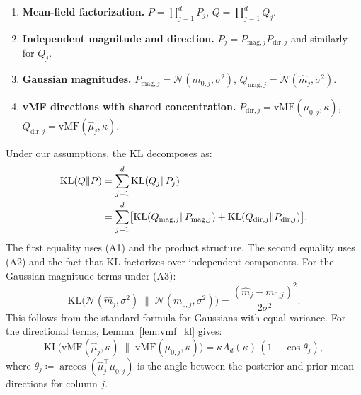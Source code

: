 \documentclass[11pt]{article}
\newcommand{\KL}{\mathrm{KL}}
\newcommand{\vMF}{\mathrm{vMF}}
\newcommand{\Ad}{A_d}
\begin{document}
\begin{enumerate}
  \item[(A1)] \textbf{Mean-field factorization.}
    $P = \prod_{j=1}^d P_j$, $Q = \prod_{j=1}^d Q_j$.
  \item[(A2)] \textbf{Independent magnitude and direction.}
    $P_j = P_{\mathrm{mag},j} P_{\mathrm{dir},j}$ and similarly for $Q_j$.
  \item[(A3)] \textbf{Gaussian magnitudes.}
    $P_{\mathrm{mag},j} = \mathcal{N}(m_{0,j}, \sigma^2)$,
    $Q_{\mathrm{mag},j} = \mathcal{N}(\hat{m}_j, \sigma^2)$.
  \item[(A4)] \textbf{vMF directions with shared concentration.}
    $P_{\mathrm{dir},j} = \vMF(\mu_{0,j}, \kappa)$,
    $Q_{\mathrm{dir},j} = \vMF(\hat{\mu}_j, \kappa)$.
\end{enumerate}
Under our assumptions, the KL decomposes as:
\begin{align}
  \KL(Q \| P)
  &= \sum_{j=1}^d \KL(Q_j \| P_j) \notag\\
  &= \sum_{j=1}^d \bigl[\KL(Q_{\mathrm{mag},j} \| P_{\mathrm{mag},j})
     + \KL(Q_{\mathrm{dir},j} \| P_{\mathrm{dir},j})\bigr].
\label{eq:kl_decomp}
\end{align}
The first equality uses (A1) and the product structure. The second equality uses (A2) and the fact that KL factorizes over independent components.
For the Gaussian magnitude terms under (A3):
\begin{equation}
  \KL\bigl(\mathcal{N}(\hat{m}_j, \sigma^2) \;\|\; \mathcal{N}(m_{0,j}, \sigma^2)\bigr)
  = \frac{(\hat{m}_j - m_{0,j})^2}{2\sigma^2}.
\label{eq:kl_gaussian}
\end{equation}
This follows from the standard formula for Gaussians with equal variance.
For the directional terms, Lemma~\ref{lem:vmf_kl} gives:
\begin{equation}
  \KL\bigl(\vMF(\hat{\mu}_j, \kappa) \;\|\; \vMF(\mu_{0,j}, \kappa)\bigr)
  = \kappa \Ad(\kappa)\,(1 - \cos\theta_j),
\label{eq:kl_vmf_col}
\end{equation}
where $\theta_j \coloneqq \arccos(\hat{\mu}_j^\top \mu_{0,j})$ is the
angle between the posterior and prior mean directions for column $j$.
\end{document}

